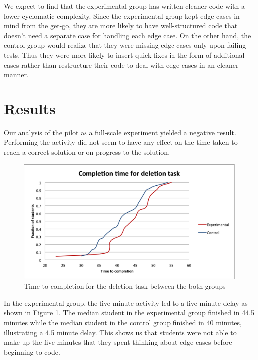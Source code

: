 \documentclass[11pt,letterpaper]{article}
\begin{document}
We expect to find that the experimental group has written cleaner code with a lower cyclomatic complexity. Since the experimental group kept edge cases in mind from the get-go, they are more likely to have well-structured code that doesn't need a separate case for handling each edge case. On the other hand, the control group would realize that they were missing edge cases only upon failing tests. Thus they were more likely to insert quick fixes in the form of additional cases rather than restructure their code to deal with edge cases in an cleaner manner.

\section{Results}
\label{sec:result}

Our analysis of the pilot as a full-scale experiment yielded a negative result. Performing the activity did not seem to have any effect on the time taken to reach a correct solution or on progress to the solution.\\

\begin{figure}
\centering
\includegraphics[scale=0.45]{figures/completion-times.png}
\caption{Time to completion for the deletion task between the both groups}
\label{fig:time-result}
\end{figure}

In the experimental group, the five minute activity led to a five minute delay as shown in Figure \ref{fig:time-result}. The median student in the experimental group finished in 44.5 minutes while the median student in the control group finished in 40 minutes, illustrating a 4.5 minute delay. This shows us that students were not able to make up the five minutes that they spent thinking about edge cases before beginning to code.\\
\end{document}
